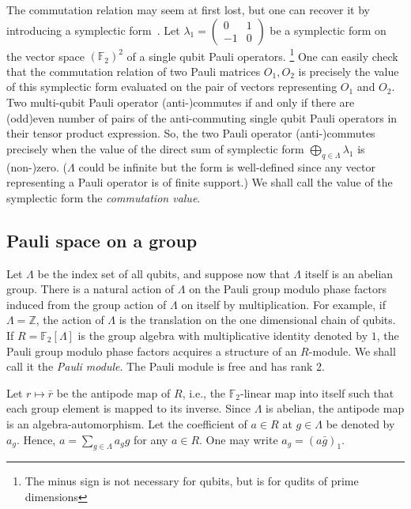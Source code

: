 \documentclass[letterpaper,12pt]{amsart}
\theoremstyle{definition} \newtheorem{defn}{Definition}
\theoremstyle{definition} \newtheorem{rem}{Remark}
\theoremstyle{definition} \newtheorem{example}{Example}
\newcommand{\FF}{\mathbb{F}}
\begin{document}
The commutation relation may seem at first lost,
but one can recover it by introducing a symplectic form~\cite{CalderbankRainsShorEtAl1997Quantum}.
Let $\lambda_1 = \begin{pmatrix} 0 & 1 \\ -1 & 0 \end{pmatrix}$
be a symplectic form on the vector space $(\FF_2)^2$ of a single qubit Pauli operators.
%
\footnote{The minus sign is not necessary for qubits, but is for qudits of prime dimensions}
%
One can easily check that the commutation relation of two Pauli matrices $O_1, O_2$
is precisely the value of this symplectic form
evaluated on the pair of vectors representing $O_1$ and $O_2$.
Two multi-qubit Pauli operator (anti-)commutes if and only if
there are (odd)even number of pairs of the anti-commuting single qubit Pauli operators
in their tensor product expression.
So, the two Pauli operator (anti-)commutes
precisely when the value of the direct sum of symplectic form $\bigoplus_{q \in \Lambda} \lambda_1$
is (non-)zero. ($\Lambda$ could be infinite but the form is well-defined since any vector representing a Pauli operator is of finite support.)
We shall call the value of the symplectic form the {\em commutation value}.


\subsection{Pauli space on a group}
\label{sec:Pauli-space-on-group}

Let $\Lambda$ be the index set of all qubits,
and suppose now that $\Lambda$ itself is an abelian group.
There is a natural action of $\Lambda$ on the Pauli group modulo phase factors
induced from the group action of $\Lambda$ on itself by multiplication.
For example, if $\Lambda = \mathbb{Z}$,
the action of $\Lambda$ is the translation on the one dimensional chain of qubits.
If $R=\FF_2[\Lambda]$ is the group algebra with multiplicative identity denoted by $1$,
the Pauli group modulo phase factors acquires a structure of an $R$-module.
We shall call it the {\em Pauli module}.
The Pauli module is free and has rank 2.

Let $r \mapsto \bar r$ be the antipode map of $R$, 
i.e., the $\FF_2$-linear map into itself 
such that each group element is mapped to its inverse.
Since $\Lambda$ is abelian, the antipode map is an algebra-automorphism.
Let the coefficient of $a \in R$ at $g \in \Lambda$ be denoted by $a_g$.
Hence, $a = \sum_{g \in \Lambda} a_g g$ for any $a \in R$.
One may write $a_g = (a \bar g)_1$.
\end{document}
